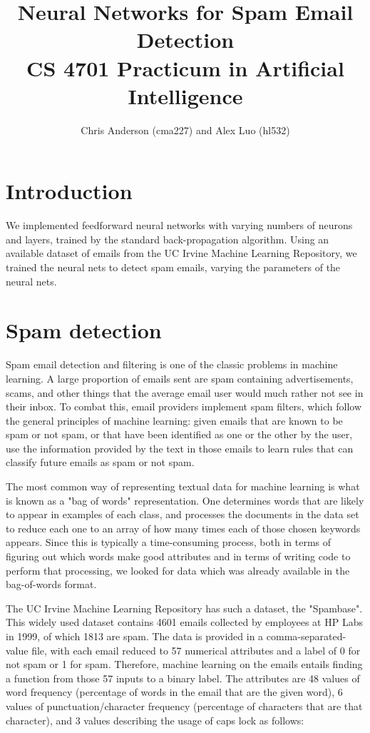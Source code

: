 \documentclass[11pt]{article} %
\title{Neural Networks for Spam Email Detection \\ CS 4701 Practicum in Artificial Intelligence}
\author{Chris Anderson (cma227) and Alex Luo (hl532)}
\begin{document}
\maketitle

\section{Introduction}

We implemented feedforward neural networks with varying numbers of neurons and layers, trained by the standard back-propagation algorithm. Using an available dataset of emails from the UC Irvine Machine Learning Repository, we trained the neural nets to detect spam emails, varying the parameters of the neural nets.

\section{Spam detection}

Spam email detection and filtering is one of the classic problems in machine learning. A large proportion of emails sent are spam containing advertisements, scams, and other things that the average email user would much rather not see in their inbox. To combat this, email providers implement spam filters, which follow the general principles of machine learning: given emails that are known to be spam or not spam, or that have been identified as one or the other by the user, use the information provided by the text in those emails to learn rules that can classify future emails as spam or not spam.

The most common way of representing textual data for machine learning is what is known as a "bag of words" representation. One determines words that are likely to appear in examples of each class, and processes the documents in the data set to reduce each one to an array of how many times each of those chosen keywords appears. Since this is typically a time-consuming process, both in terms of figuring out which words make good attributes and in terms of writing code to perform that processing, we looked for data which was already available in the bag-of-words format.

The UC Irvine Machine Learning Repository has such a dataset, the "Spambase". This widely used dataset contains 4601 emails collected by employees at HP Labs in 1999, of which 1813 are spam. The data is provided in a comma-separated-value file, with each email reduced to 57 numerical attributes and a label of 0 for not spam or 1 for spam. Therefore, machine learning on the emails entails finding a function from those 57 inputs to a binary label. The attributes are 48 values of word frequency (percentage of words in the email that are the given word), 6 values of punctuation/character frequency (percentage of characters that are that character), and 3 values describing the usage of caps lock as follows:
\end{document}
